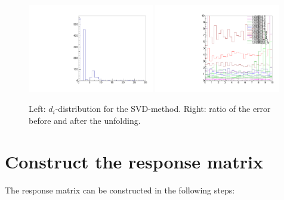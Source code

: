 \documentclass[a4paper,11pt]{article}
\begin{document}
\begin{figure}[H]
	\centering
	\includegraphics[width=0.49\textwidth]{figs/unfold-svd-ddistr.pdf}
	\includegraphics[width=0.49\textwidth]{figs/unfold-error-reg.pdf}
	\caption{ \label{fig:sol:reg2} Left: $d_i$-distribution for the \gls{SVD}-method. Right: ratio of the error before and after the unfolding.}
\end{figure}

\FloatBarrier
\section{Construct the response matrix}

The response matrix can be constructed in the following steps:
\end{document}
